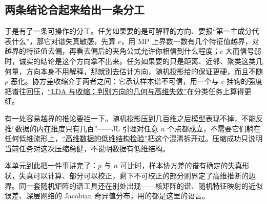 \subsection{两条结论合起来给出一条分工}

于是有了一条可操作的分工。任务如果要的是可解释的方向、要报``第一主成分代表什么''，那它对谱失真敏感，先算 \(c\)，用 MP 上界数一数有几个特征值越界，对越界的特征值去偏，再看去偏后的夹角公式允许你相信到什么程度；\(c\) 大而信号弱时，诚实的结论是这个方向拿不出来。任务如果要的只是距离、近邻、聚类这类几何量，方向本身不用解释，那就别去估计方向，随机投影给的保证更硬，而且不随 \(p\) 恶化。协方差收缩介于两者之间：它承认样本谱不可信，用一个与 \(c\) 挂钩的强度把谱往回压，\hyperref[sec:13-Machine-Learning/06-Probabilistic-Models/02]{``LDA 与收缩：判别方向的几何与高维失效''}在分类任务上算得更细。

有一处容易越界的推论要拦一下。随机投影压到几百维之后模型表现不掉，不能反推``数据的内在维度只有几百''——JL 引理对任意 \(n\) 个点都成立，不需要它们躺在任何低维流形上，\hyperref[sec:14-Deep-Learning/10-Interpretability-Mathematics/03]{``高维数据的低维结构检验''}把这个混淆拆开过。压缩成功只说明当前任务对这次压缩稳健，不说明数据有低维结构。

本单元到此把一件事讲完了：\(p\) 与 \(n\) 可比时，样本协方差的谱有确定的失真形状，失真可以计算、部分可以校正，剩下不可校正的部分则界定了高维推断的边界。同一套随机矩阵的谱工具还在别处出现——核矩阵的谱、随机特征映射的近似误差、深层网络的 Jacobian 奇异值分布，用的都是这里的语言。

